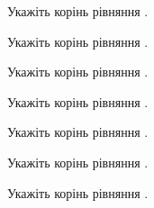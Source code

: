 \documentclass[12pt]{article}
\begin{document}
\begin{samepage}
\noindent\zadnum Укажіть корінь рівняння . 

\nmtnobreak
\nopagebreak\nbvspace{0.3cm}
\par{}
\end{samepage}

\begin{samepage}
\noindent\zadnum Укажіть корінь рівняння . 

\nmtnobreak
\nopagebreak\nbvspace{0.3cm}
\par{}
\end{samepage}

\begin{samepage}
\noindent\zadnum Укажіть корінь рівняння . 

\nmtnobreak
\nopagebreak\nbvspace{0.3cm}
\par{}
\end{samepage}

\begin{samepage}
\noindent\zadnum Укажіть корінь рівняння . 

\nmtnobreak
\nopagebreak\nbvspace{0.3cm}
\par{}
\end{samepage}

\begin{samepage}
\noindent\zadnum Укажіть корінь рівняння . 

\nmtnobreak
\nopagebreak\nbvspace{0.3cm}
\par{}
\end{samepage}

\begin{samepage}
\noindent\zadnum Укажіть корінь рівняння . 

\nmtnobreak
\nopagebreak\nbvspace{0.3cm}
\par{}
\end{samepage}

\begin{samepage}
\noindent\zadnum Укажіть корінь рівняння . 

\nmtnobreak
\nopagebreak\nbvspace{0.3cm}
\par{}
\end{samepage}

\endgroup
\end{document}
